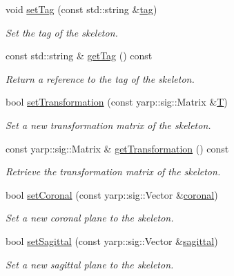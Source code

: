 \begin{DoxyCompactItemize}
void \mbox{\hyperlink{classassistive__rehab_1_1Skeleton_ae1c830e3d9a0ba692e5ae297caa52a82}{set\+Tag}} (const std\+::string \&\mbox{\hyperlink{classassistive__rehab_1_1Skeleton_a3d1ce5280300e012826948dc4383c2cb}{tag}})
\begin{DoxyCompactList}\small\item\em Set the tag of the skeleton. \end{DoxyCompactList}\item 
const std\+::string \& \mbox{\hyperlink{classassistive__rehab_1_1Skeleton_a185654045d5e43b3853cdb8fdd676da6}{get\+Tag}} () const
\begin{DoxyCompactList}\small\item\em Return a reference to the tag of the skeleton. \end{DoxyCompactList}\item 
bool \mbox{\hyperlink{classassistive__rehab_1_1Skeleton_a3486cbd7f59e75c1d9ef26cbc05bb72f}{set\+Transformation}} (const yarp\+::sig\+::\+Matrix \&\mbox{\hyperlink{classassistive__rehab_1_1Skeleton_a358a1c5eb23a562f8558ff8d43583ef7}{T}})
\begin{DoxyCompactList}\small\item\em Set a new transformation matrix of the skeleton. \end{DoxyCompactList}\item 
const yarp\+::sig\+::\+Matrix \& \mbox{\hyperlink{classassistive__rehab_1_1Skeleton_a2bdcc0d686a5a232aa2c07528cf2e647}{get\+Transformation}} () const
\begin{DoxyCompactList}\small\item\em Retrieve the transformation matrix of the skeleton. \end{DoxyCompactList}\item 
bool \mbox{\hyperlink{classassistive__rehab_1_1Skeleton_ab3bd697f48ea69cfdc5ff7574c19041f}{set\+Coronal}} (const yarp\+::sig\+::\+Vector \&\mbox{\hyperlink{classassistive__rehab_1_1Skeleton_ad042a7e60e6d72cc87b06c5fb0bdfae2}{coronal}})
\begin{DoxyCompactList}\small\item\em Set a new coronal plane to the skeleton. \end{DoxyCompactList}\item 
bool \mbox{\hyperlink{classassistive__rehab_1_1Skeleton_af92fdb0e3eb88a0b1dedd5038e2c6eb7}{set\+Sagittal}} (const yarp\+::sig\+::\+Vector \&\mbox{\hyperlink{classassistive__rehab_1_1Skeleton_a72d6ccb619619e77a17258b08496a972}{sagittal}})
\begin{DoxyCompactList}\small\item\em Set a new sagittal plane to the skeleton. \end{DoxyCompactList}\item 

\end{DoxyCompactItemize}
